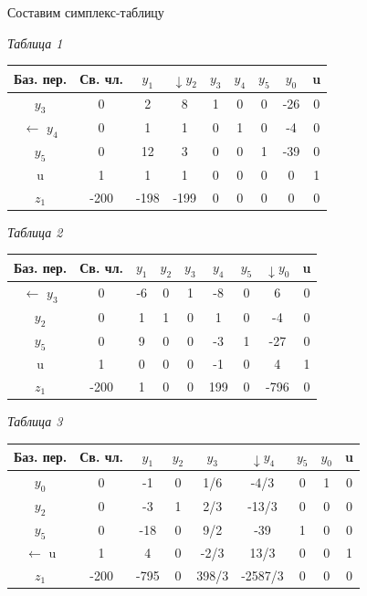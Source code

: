 {Составим симплекс-таблицу
\begin{flushright}
	\textit{Таблица 1}
\end{flushright}
\begin{center}
	\begin{tabular}{|c|c|c|c|c|c|c|c|c|}
		\hline
		Баз. пер. & Св. чл. & $y_{1}$ &$\downarrow y_{2}$ & $y_{3}$ & $y_{4}$ & $y_{5}$ & $y_{0}$ & u  \\
		\hline
		$y_{3}$ & 0 &2&8&1&0&0&-26&0 \\
		\hline

		$\leftarrow$
		$y_{4}$&0&1&1&0&1&0&-4&0\\
		\hline
		$y_{5}$&0&12&3&0&0&1&-39&0\\
		\hline
		u&1&1&1&0&0&0&0&1\\
		\hline
		$z_{1}$&-200&-198&-199&0&0&0&0&0\\
		\hline
	\end{tabular}
\end{center}

\begin{flushright}
	\textit{Таблица 2}
\end{flushright}
\begin{center}
	\begin{tabular}{|c|c|c|c|c|c|c|c|c|}
		\hline
		Баз. пер. & Св. чл. & $y_{1}$ & $y_{2}$ & $y_{3}$ & $y_{4}$ & $y_{5}$ & $\downarrow y_{0}$ & u  \\
		\hline
		$\leftarrow$
		$y_{3}$ & 0&-6&0&1&-8&0&6&0 \\
		\hline
		$y_{2}$&0&1&1&0&1&0&-4&0\\
		\hline
		$y_{5}$&0&9&0&0&-3&1&-27&0\\
		\hline
		u&1&0&0&0&-1&0&4&1\\
		\hline
		$z_{1}$&-200&1&0&0&199&0&-796&0\\
		\hline
	\end{tabular}
\end{center}

\begin{flushright}
	\textit{Таблица 3}
\end{flushright}
\begin{center}
	\begin{tabular}{|c|c|c|c|c|c|c|c|c|}
		\hline
		Баз. пер. & Св. чл. & $y_{1}$ & $y_{2}$ & $y_{3}$ & $\downarrow y_{4}$ & $y_{5}$ & $y_{0}$ & u  \\
		\hline
		$y_{0}$ &0&-1&0&1/6&-4/3&0&1&0 \\
		\hline
		$y_{2}$&0&-3&1&2/3&-13/3&0&0&0\\
		\hline
		$y_{5}$&0&-18&0&9/2&-39&1&0&0\\
		\hline
		$\leftarrow$
		u&1&4&0&-2/3&13/3&0&0&1\\
		\hline
		$z_{1}$&-200&-795&0&398/3&-2587/3&0&0&0\\
		\hline
	\end{tabular}
\end{center}

}
